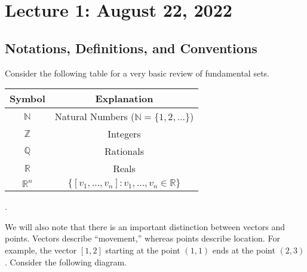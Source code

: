 \section{Lecture 1: August 22, 2022}

    \subsection{Notations, Definitions, and Conventions}

    Consider the following table for a very basic review of fundamental sets.
    \begin{center}
        \begin{tabular}{|c|c|}
            \hline
            \hline
            Symbol & Explanation \\
            \hline
            \hline
            \(\mathbb{N}\) & Natural Numbers (\(\mathbb{N}=\{1,2,\ldots\}\)) \\
            \hline
            \(\mathbb{Z}\) & Integers \\
            \hline
            \(\mathbb{Q}\) & Rationals \\
            \hline
            \(\mathbb{R}\) & Reals \\
            \hline
            \(\mathbb{R}^n\) & \(\{[v_1,\ldots,v_n]:v_1,\ldots,v_n\in\mathbb{R}\}\) \\
            \hline 
        \end{tabular}.
    \end{center}
    We will also note that there is an important distinction between vectors and points. Vectors describe ``movement,'' whereas points describe location. For example, the vector \([1,2]\) starting at the point \((1,1)\) ends at the point \((2,3)\). Consider the following diagram.
    \begin{center}
    \end{center}
